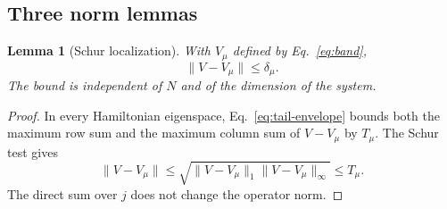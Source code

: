 \documentclass[aps,floatfix,10pt,amssymb,amsmath,superscriptaddress,nofootinbib,longbibliography,nobalancelastpage,twocolumn]{revtex4-2}
\newtheorem{lemma}{Lemma}
\begin{document}
\subsection{Three norm lemmas}

\begin{lemma}[Schur localization]
\label{lem:schur}
With $V_\mu$ defined by Eq.~\eqref{eq:band},
\begin{equation}
 \|V-V_\mu\|\leq\delta_\mu.
 \label{eq:schur}
\end{equation}
The bound is independent of $N$ and of the dimension of the system.
\end{lemma}
\begin{proof}
In every Hamiltonian eigenspace, Eq.~\eqref{eq:tail-envelope} bounds both the maximum row sum and the maximum column sum of $V-V_\mu$ by $T_\mu$.  The Schur test gives
\begin{equation}
 \|V-V_\mu\|\leq
 \sqrt{\|V-V_\mu\|_1\|V-V_\mu\|_\infty}\leq T_\mu.
\end{equation}
The direct sum over $j$ does not change the operator norm.
\end{proof}
\end{document}
